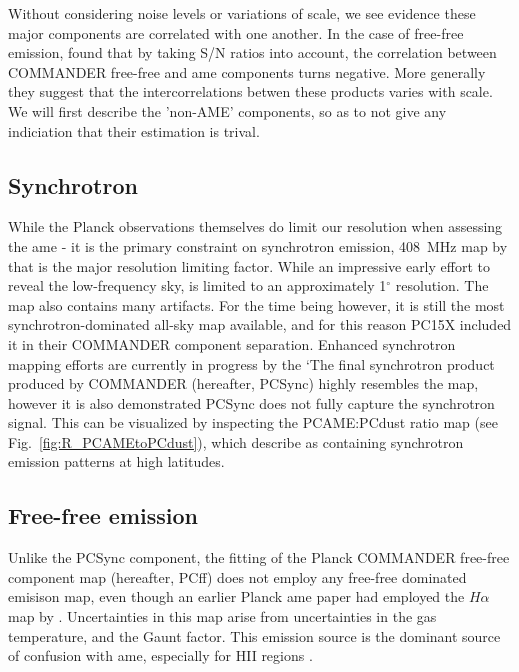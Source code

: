         Without considering noise levels or variations of scale, we see evidence these major components are correlated with one another. In the case of free-free emission,  \cite{vonHausegger15} found that by taking S/N ratios into account, the correlation between COMMANDER free-free and \acrshort{ame} components turns negative. More generally they suggest that the intercorrelations betwen these products varies with scale. We will first describe the 'non-AME' components, so as to not give any indiciation that their estimation is trival.

       \subsection{Synchrotron}
          While the Planck observations themselves do limit our resolution when assessing the \acrshort{ame} - it is the primary constraint on synchrotron emission, 408~MHz map by \cite{haslam82} that is the major resolution limiting factor. While an impressive early effort to reveal the low-frequency sky, \citep{haslam82} is limited to an approximately 1$^{\circ}$ resolution. The map also contains many artifacts. For the time being however, it is still the most synchrotron-dominated all-sky map available, and for this reason PC15X included it in their COMMANDER component separation. Enhanced synchrotron mapping efforts are currently in progress by the `The final synchrotron product produced by COMMANDER (hereafter, PCSync) highly resembles the \cite{haslam82} map, however it is also demonstrated PCSync does not fully capture the synchrotron signal. This can be visualized by inspecting the PCAME:PCdust ratio map (see Fig.~\ref{fig:R_PCAMEtoPCdust}), which \cite{hensley16} describe as containing synchrotron emission patterns at high latitudes.

       \subsection{Free-free emission}
          Unlike the PCSync component, the fitting of the Planck COMMANDER free-free component map (hereafter, PCff) does not employ any free-free dominated emisison map, even though an earlier Planck \acrshort{ame} paper \citep{planckXV} had employed the $H\alpha$ map by \cite{finkbeiner03}. Uncertainties in this map arise from uncertainties in the gas temperature, and the Gaunt factor. This emission source is the dominant source of confusion with \acrshort{ame}, especially for HII regions \citep{planckXV,planckXII, paladini15}.

